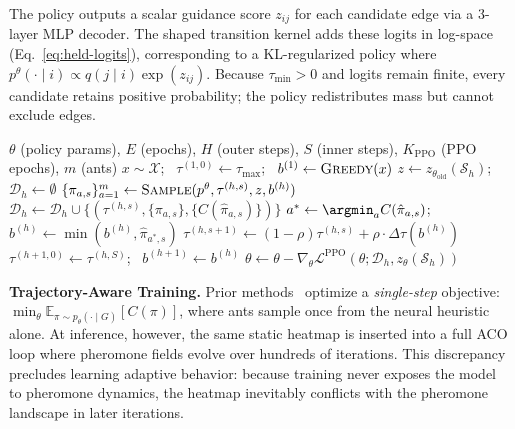 \documentclass[sigconf]{acmart}
\newcommand{\DyNACO}{\textsc{DyNACO}}
\begin{document}
The policy outputs a scalar guidance score $z_{ij}$ for each candidate edge via a 3-layer MLP decoder.
The shaped transition kernel adds these logits in log-space (Eq.~\ref{eq:held-logits}), corresponding to a KL-regularized policy where $p^\theta(\cdot\mid i) \propto q(j\mid i)\exp(z_{ij})$.
Because $\tau_{\min} > 0$ and logits remain finite, every candidate retains positive probability; the policy redistributes mass but cannot exclude edges.
\begin{algorithm}[t]
\caption{PPO training for \DyNACO{}.}
\label{alg:train}
\begin{algorithmic}[1]
\REQUIRE $\theta$ (policy params), $E$ (epochs), $H$ (outer steps), $S$ (inner steps), $K_{\text{PPO}}$ (PPO epochs), $m$ (ants)
    \STATE $x \sim \mathcal{X}$; \, $\tau^{(1,0)} \gets \tau_{\max}$; \, $b^{(1)} \gets \textsc{Greedy}(x)$
        \STATE $z \gets z_{\theta_{\text{old}}}(\mathcal{S}_h)$; \, $\mathcal{D}_h \gets \emptyset$
            \STATE $\{\pi_{a,s}\}_{a=1}^m \gets \textsc{Sample}(p^\theta, \tau^{(h,s)}, z, b^{(h)})$
            \STATE $\mathcal{D}_h \gets \mathcal{D}_h \cup \{(\tau^{(h,s)}, \{\pi_{a,s}\}, \{C(\hat{\pi}_{a,s})\})\}$
            \STATE $a^* \gets \argmin_a C(\hat{\pi}_{a,s})$; \, $b^{(h)} \gets \min(b^{(h)}, \hat{\pi}_{a^*,s})$
            \STATE $\tau^{(h,s+1)} \gets (1{-}\rho)\tau^{(h,s)} + \rho \cdot \Delta\tau(b^{(h)})$
        \ENDFOR
        \STATE $\tau^{(h+1,0)} \gets \tau^{(h,S)}$; \, $b^{(h+1)} \gets b^{(h)}$
            \STATE $\theta \gets \theta - \nabla_\theta \mathcal{L}^{\text{PPO}}(\theta; \mathcal{D}_h, z_\theta(\mathcal{S}_h))$
        \ENDFOR
    \ENDFOR
\ENDFOR
\end{algorithmic}
\end{algorithm}



\smallskip\noindent\textbf{Trajectory-Aware Training.}
\label{sec:training}
Prior methods~\cite{deepaco,gfacs,gtgaco} optimize a \emph{single-step} objective: $\min_\theta \mathbb{E}_{\pi \sim p_\theta(\cdot \mid G)} [ C(\pi) ]$, where ants sample once from the neural heuristic alone.
At inference, however, the same static heatmap is inserted into a full ACO loop where pheromone fields evolve over hundreds of iterations.
This discrepancy precludes learning adaptive behavior: because training never exposes the model to pheromone dynamics, the heatmap inevitably conflicts with the pheromone landscape in later iterations.
\end{document}
